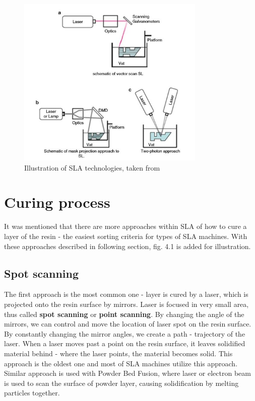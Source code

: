 \documentclass[a4paper, twoside, 11pt]{report}
\begin{document}
\begin{figure}[t]
  \centering
  \includegraphics[width=0.8\textwidth]{SLAillustration}
  \caption{Illustration of SLA technologies, taken from \cite[p. 65]{AMT}}
\end{figure}
%
\section{Curing process} 
It was mentioned that there are more approaches within SLA of how to cure a layer of the resin - the easiest sorting criteria for types of SLA machines. With these approaches described in following section, fig. 4.1 is added for illustration.
\subsection{Spot scanning}
The first approach is the most common one - layer is cured by a laser, which is projected onto the resin surface by mirrors. Laser is focused in very small area, thus called \textbf{spot scanning} or \textbf{point scanning}. By changing the angle of the mirrors, we can control and move the location of laser spot on the resin surface. By constantly changing the mirror angles, we create a path - trajectory of the laser. When a laser moves past a point on the resin surface, it leaves solidified material behind - where the laser points, the material becomes solid. This approach is the oldest one and most of SLA machines utilize this approach. Similar approach is used with Powder Bed Fusion, where laser or electron beam is used to scan the surface of powder layer, causing solidification by melting particles together.
\end{document}

